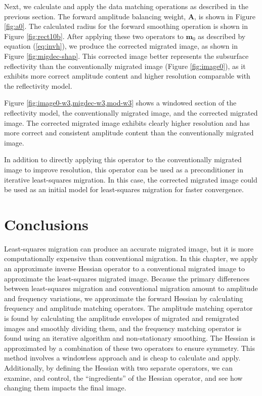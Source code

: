
    Next, we calculate and apply the data matching operations as described in the previous section. 
    The forward amplitude balancing weight, $\mathbf{A}$, is shown in Figure \ref{fig:a0}.
    The calculated radius for the forward smoothing operation is shown in Figure \ref{fig:rect10b}.
    After applying these two operators to $\mathbf{m}_0$ as described by equation (\ref{eq:invh}), we produce the corrected migrated image, as shown in Figure \ref{fig:migdec-shap}.
    This corrected image better represents the subsurface reflectivity than the conventionally migrated image (Figure \ref{fig:image0}), as it exhibits more correct amplitude content and higher resolution comparable with the reflectivity model.


    Figure \ref{fig:image0-w3,migdec-w3,mod-w3} shows a windowed section of the reflectivity model, the conventionally migrated image, and the corrected migrated image.
    The corrected migrated image exhibits clearly higher resolution and has more correct and consistent amplitude content than the conventionally migrated image.

    In addition to directly applying this operator to the conventionally migrated image to improve resolution, this operator can be used as a preconditioner in iterative least-squares migration.
    In this case, the corrected migrated image could be used as an initial model for least-squares migration for faster convergence.

\section{Conclusions}
    Least-squares migration can produce an accurate migrated image, but it is more computationally expensive than conventional migration.
    In this chapter, we apply an approximate inverse Hessian operator to a conventional migrated image to approximate the least-squares migrated image.
    Because the primary differences between least-squares migration and conventional migration amount to amplitude and frequency variations, we approximate the forward Hessian by calculating frequency and amplitude matching operators.
    The amplitude matching operator is found by calculating the amplitude envelopes of migrated and remigrated images and smoothly dividing them, and the frequency matching operator is found using an iterative algorithm and non-stationary smoothing.
    The Hessian is approximated by a combination of these two operators to ensure symmetry.
    This method involves a windowless approach and is cheap to calculate and apply.
    Additionally, by defining the Hessian with two separate operators, we can examine, and control, the ``ingredients'' of the Hessian operator, and see how changing them impacts the final image.


